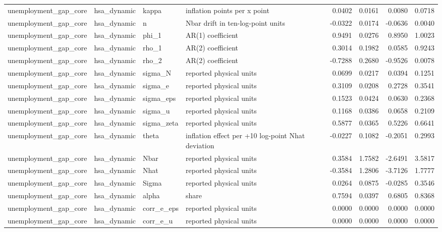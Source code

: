 \begin{tabular}{llllrrrr}
unemployment\_gap\_core & hsa\_dynamic & kappa & inflation points per x point & 0.0402 & 0.0161 & 0.0080 & 0.0718 \\
unemployment\_gap\_core & hsa\_dynamic & n & Nbar drift in ten-log-point units & -0.0322 & 0.0174 & -0.0636 & 0.0040 \\
unemployment\_gap\_core & hsa\_dynamic & phi\_1 & AR(1) coefficient & 0.9491 & 0.0276 & 0.8950 & 1.0023 \\
unemployment\_gap\_core & hsa\_dynamic & rho\_1 & AR(2) coefficient & 0.3014 & 0.1982 & 0.0585 & 0.9243 \\
unemployment\_gap\_core & hsa\_dynamic & rho\_2 & AR(2) coefficient & -0.7288 & 0.2680 & -0.9526 & 0.0078 \\
unemployment\_gap\_core & hsa\_dynamic & sigma\_N & reported physical units & 0.0699 & 0.0217 & 0.0394 & 0.1251 \\
unemployment\_gap\_core & hsa\_dynamic & sigma\_e & reported physical units & 0.3109 & 0.0208 & 0.2728 & 0.3541 \\
unemployment\_gap\_core & hsa\_dynamic & sigma\_eps & reported physical units & 0.1523 & 0.0424 & 0.0630 & 0.2368 \\
unemployment\_gap\_core & hsa\_dynamic & sigma\_u & reported physical units & 0.1168 & 0.0386 & 0.0658 & 0.2109 \\
unemployment\_gap\_core & hsa\_dynamic & sigma\_zeta & reported physical units & 0.5877 & 0.0365 & 0.5226 & 0.6641 \\
unemployment\_gap\_core & hsa\_dynamic & theta & inflation effect per +10 log-point Nhat deviation & -0.0227 & 0.1082 & -0.2051 & 0.2993 \\
unemployment\_gap\_core & hsa\_dynamic & Nbar & reported physical units & 0.3584 & 1.7582 & -2.6491 & 3.5817 \\
unemployment\_gap\_core & hsa\_dynamic & Nhat & reported physical units & -0.3584 & 1.2806 & -3.7126 & 1.7777 \\
unemployment\_gap\_core & hsa\_dynamic & Sigma & reported physical units & 0.0264 & 0.0875 & -0.0285 & 0.3546 \\
unemployment\_gap\_core & hsa\_dynamic & alpha & share & 0.7594 & 0.0397 & 0.6805 & 0.8368 \\
unemployment\_gap\_core & hsa\_dynamic & corr\_e\_eps & reported physical units & 0.0000 & 0.0000 & 0.0000 & 0.0000 \\
unemployment\_gap\_core & hsa\_dynamic & corr\_e\_u & reported physical units & 0.0000 & 0.0000 & 0.0000 & 0.0000 \\

\end{tabular}
